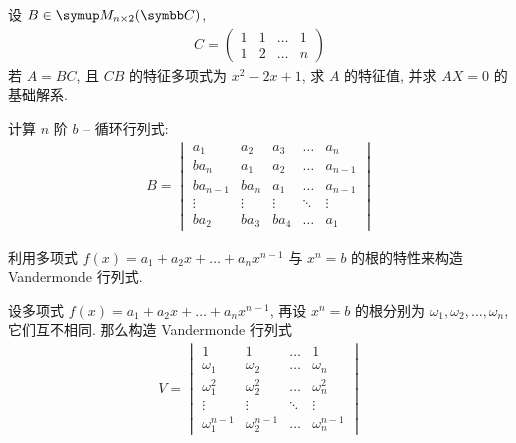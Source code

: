 \documentclass{ctexart}
\begin{document}
\begin{exercise}[series=exer]
\begin{answer}
    \end{answer}
    \item 设 $ B \in \MM[\C][n \times 2] $, 
    \begin{align*}
        C = \begin{pmatrix}
            1 & 1 & \dots & 1\\
            1 & 2 & \dots & n
        \end{pmatrix}
    \end{align*}
    若 $ A = BC $, 且 $ CB $ 的特征多项式为 $ x^{2} - 2x + 1 $, 求 $ A $ 的特征值, 并求 $ AX = 0 $ 的基础解系. 
    \item  计算 $ n $ 阶 $ b $ -- 循环行列式:
    \begin{align*}
        B = \begin{vmatrix}
            a_{1}   & a_{2} & a_{3} & \ldots    & a_{n} \\
            ba_{n}  & a_{1} & a_{2} & \ldots    & a_{n-1} \\
            ba_{n-1}    & ba_{n}    & a_{1} & \ldots & a_{n-1} \\
            \vdots  & \vdots & \vdots & \ddots & \vdots \\
            ba_{2} & ba_{3} & ba_{4} & \ldots & a_{1}
        \end{vmatrix}
    \end{align*}
    \begin{hint}
        利用多项式 $ f(x) = a_{1} + a_{2}x + \dots + a_{n}x^{n-1} $ 与 $ x^{n} = b $ 的根的特性来构造 Vandermonde 行列式. 
    \end{hint}
    \begin{answer}
        设多项式 $ f(x) = a_{1} + a_{2}x + \dots + a_{n}x^{n-1} $, 再设 $ x^{n} = b $ 的根分别为 $ \omega_{1}, \omega_{2}, \dots, \omega_{n} $, 它们互不相同. 那么构造 Vandermonde 行列式
        \begin{align*}
            V = \begin{vmatrix}
                1 & 1 & \dots & 1\\
                \omega_{1} & \omega_{2} & \dots & \omega_{n}\\
                \omega_{1}^{2} & \omega_{2}^{2} & \dots & \omega_{n}^{2}\\
                \vdots & \vdots & \ddots & \vdots\\
                \omega_{1}^{n-1} & \omega_{2}^{n-1} & \dots & \omega_{n}^{n-1}
            \end{vmatrix}
        \end{align*}

\end{answer}
\end{exercise}
\end{document}
